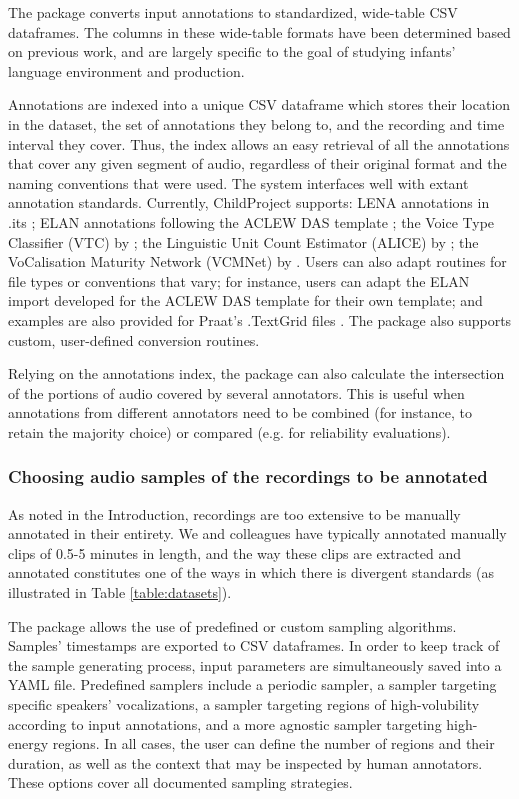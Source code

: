 \documentclass[smallextended]{svjour3}       %
\begin{document}
The package converts input annotations to standardized, wide-table CSV dataframes. The columns in these wide-table formats have been determined based on previous work, and are largely specific to the goal of studying infants' language environment and production.

Annotations are indexed into a unique CSV dataframe which stores their location in the dataset, the set of annotations they belong to, and the recording and time interval they cover. Thus, the index allows an easy retrieval of all the annotations that cover any given segment of audio, regardless of their original format and the naming conventions that were used. The system interfaces well with extant annotation standards. Currently, ChildProject supports: LENA annotations in .its \citep{xu2008lenatm}; ELAN annotations following the ACLEW DAS template  \citep{Casillas2017,pympi-1.70}; the Voice Type Classifier (VTC) by \citet{lavechin2020opensource}; the Linguistic Unit Count Estimator (ALICE) by \citet{rasanen2020}; the VoCalisation Maturity Network (VCMNet) by \citet{AlFutaisi2019}. Users can also adapt routines for file types or conventions that vary; for instance, users can adapt the ELAN import developed for the ACLEW DAS template for their own template; and examples are also provided for Praat's .TextGrid files \citep{boersma2006praat}. The package also supports custom, user-defined conversion routines.

Relying on the annotations index, the package can also calculate the intersection of the portions of audio covered by several annotators. This is useful when annotations from different annotators need to be combined (for instance, to retain the majority choice) or compared (e.g. for reliability evaluations).

\subsubsection*{Choosing audio samples of the recordings to be annotated}\label{section:choosing}

As noted in the Introduction, recordings are too extensive to be manually annotated in their entirety. We and colleagues have typically annotated manually clips of 0.5-5 minutes in length, and the way these clips are extracted and annotated constitutes one of the ways in which there is divergent standards (as illustrated in Table \ref{table:datasets}).

The package allows the use of predefined or custom sampling algorithms. Samples' timestamps are exported to CSV dataframes. In order to keep track of the sample generating process, input parameters are simultaneously saved into a YAML file. Predefined samplers include a periodic sampler, a sampler targeting specific speakers' vocalizations, a sampler targeting regions of high-volubility according to input annotations, and a more agnostic sampler targeting high-energy regions. In all cases, the user can define the number of regions and their duration, as well as the context that may be inspected by human annotators. These options cover all documented sampling strategies.
\end{document}
